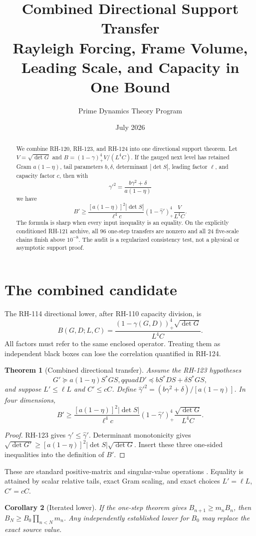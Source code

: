 \documentclass[12pt]{article}\usepackage[margin=1in]{geometry}\usepackage{amsmath,amssymb,amsthm,graphicx,natbib,microtype}\newtheorem{theorem}{Theorem}\newtheorem{corollary}[theorem]{Corollary}
\title{Combined Directional Support Transfer\\\large Rayleigh Forcing, Frame Volume, Leading Scale, and Capacity in One Bound}\author{Prime Dynamics Theory Program}\date{July 2026}
\begin{document}
\maketitle
\begin{abstract}
We combine RH-120, RH-123, and RH-124 into one directional support theorem.
Let $V=\sqrt{\det G}$ and
$B=(1-\gamma)_+^4V/(L^4C)$.  If the gauged next level has retained Gram
$a(1-\eta)$, tail parameters $b,\delta$, determinant $|\det S|$, leading
factor $\ell$, and capacity factor $c$, then with
\[
\widehat\gamma'^2=\frac{b\gamma^2+\delta}{a(1-\eta)}
\]
we have
\[
B'\geq\frac{[a(1-\eta)]^2|\det S|}{\ell^4c}
(1-\widehat\gamma')_+^4\frac{V}{L^4C}.
\]
The formula is sharp when every input inequality is an equality.  On the
explicitly conditioned RH-121 archive, all 96 one-step transfers are
nonzero and all 24 five-scale chains finish above $10^{-8}$.  The audit is a
regularized consistency test, not a physical or asymptotic support proof.
\end{abstract}
\section{The combined candidate}
The RH-114 directional lower, after RH-110 capacity division, is
\[
B(G,D;L,C)=\frac{(1-\gamma(G,D))_+^4\sqrt{\det G}}{L^4C}.
\]
All factors must refer to the same enclosed operator.  Treating them as
independent black boxes can lose the correlation quantified in RH-124.

\begin{theorem}[Combined directional transfer]\label{thm:combined}
Assume the RH-123 hypotheses
\[
G'\succeq a(1-\eta)S^*GS,qquad
D'\preceq bS^*DS+\delta S^*GS,
\]
and suppose $L'\leq\ell L$ and $C'\leq cC$.  Define
$\widehat\gamma'^2=(b\gamma^2+\delta)/[a(1-\eta)]$.  In four dimensions,
\[
B'\geq \frac{[a(1-\eta)]^2|\det S|}{\ell^4c}
(1-\widehat\gamma')_+^4\frac{\sqrt{\det G}}{L^4C}.
\]
\end{theorem}
\begin{proof}
RH-123 gives $\gamma'\leq\widehat\gamma'$.  Determinant monotonicity gives
$\sqrt{\det G'}\geq[a(1-\eta)]^2|\det S|\sqrt{\det G}$.  Insert these three
one-sided inequalities into the definition of $B'$.
\end{proof}
These are standard positive-matrix and singular-value operations
\citep{Bhatia2007,HornJohnson1991}.  Equality is attained by scalar relative
tails, exact Gram scaling, and exact choices $L'=\ell L$, $C'=cC$.

\begin{corollary}[Iterated lower]
If the one-step theorem gives $B_{n+1}\geq m_nB_n$, then
$B_N\geq B_0\prod_{n<N}m_n$.  Any independently established lower for
$B_0$ may replace the exact source value.
\end{corollary}
\end{document}

